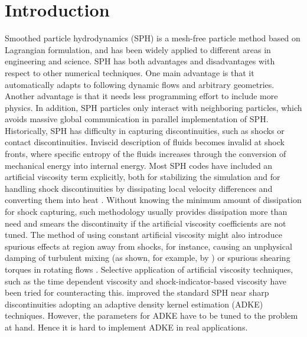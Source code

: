 \documentclass[review]{elsarticle}
\begin{document}
\linenumbers
\section{Introduction}
Smoothed particle hydrodynamics (SPH) \citep{gingold1977smoothed,lucy1977numerical} is a mesh-free particle method based on Lagrangian formulation, and has been widely applied to different areas in engineering and science. SPH has both advantages and disadvantages with respect to other numerical techniques. One main advantage is that it automatically adapts to following dynamic flows and arbitrary geometries. Another advantage is that it needs less programming effort to include more physics. In addition, SPH particles only interact with neighboring particles, which avoids massive global communication in parallel implementation of SPH.
Historically, SPH has difficulty in capturing discontinuities, such as shocks or contact discontinuities. Inviscid description of fluids becomes invalid at shock fronts, where specific entropy of the fluids increases through the conversion of mechanical energy into internal energy. Most SPH codes have included an artificial viscosity term explicitly, both for stabilizing the simulation and for handling shock discontinuities by dissipating local velocity differences and converting them into heat \citep{monaghan1983shock, monaghan1997sph, klapp2012strong}. Without knowing the minimum amount of dissipation for shock capturing, such methodology usually provides dissipation more than need and smears the discontinuity if the artificial viscosity coefficients are not tuned. The method of using constant artificial viscosity might also introduce spurious effects at region away from shocks, for instance, causing an unphysical damping of turbulent mixing (as shown, for example, by \citet{borgani2012hydrodynamic}) or spurious
shearing torques in rotating flows \citep{flebbe1994smoothed}. Selective application of artificial viscosity techniques, such as the time dependent viscosity \citep{morris1997switch, dolag2005turbulent} and shock-indicator-based viscosity \citep{cullen2010inviscid} have been tried for counteracting this. 
\citet{sigalotti2008adaptive} improved the standard SPH near sharp discontinuities adopting an adaptive density kernel estimation (ADKE) techniques. However, the parameters for ADKE have to be tuned to the problem at hand. Hence it is hard to implement ADKE in real applications.
\end{document}
